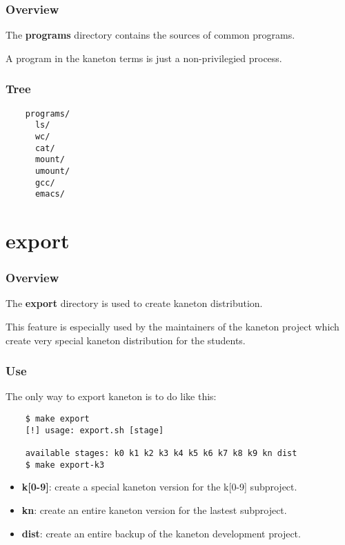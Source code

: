 \begin{frame}
  \frametitle{Overview}

  The \textbf{programs} directory contains the sources of common
  programs.

  \nl

  A program in the kaneton terms is just a non-privilegied
  process.
\end{frame}


\begin{frame}[containsverbatim]
  \frametitle{Tree}

  \begin{verbatim}
    programs/
      ls/
      wc/
      cat/
      mount/
      umount/
      gcc/
      emacs/
  \end{verbatim}
\end{frame}

%
%

\section{export}


\begin{frame}
  \frametitle{Overview}

  The \textbf{export} directory is used to create kaneton distribution.

  \nl

  This feature is especially used by the maintainers of the kaneton
  project which create very special kaneton distribution for
  the students.
\end{frame}


\begin{frame}[containsverbatim]
  \frametitle{Use}

  The only way to export kaneton is to do like this:

  \begin{verbatim}
    $ make export
    [!] usage: export.sh [stage]

    available stages: k0 k1 k2 k3 k4 k5 k6 k7 k8 k9 kn dist
    $ make export-k3
  \end{verbatim}

  \begin{itemize}
    \item
      \textbf{k[0-9]}: create a special kaneton version for the k[0-9]
      subproject.
    \item
      \textbf{kn}: create an entire kaneton version for the lastest
      subproject.
    \item
      \textbf{dist}: create an entire backup of the kaneton development
      project.
  \end{itemize}
\end{frame}

